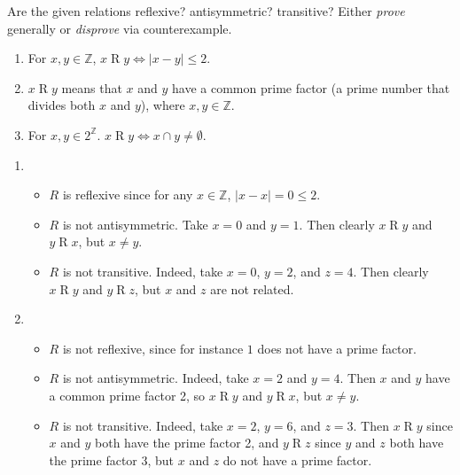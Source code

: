 \documentclass{article}
\newcommand{\Z}{\mathbb{Z}}
\theoremstyle{definition}
\begin{document}
\begin{question}
    Are the given relations reflexive? antisymmetric? transitive? Either \textit{prove} generally or \textit{disprove} via 
    counterexample.
    	\begin{enumerate}
	\item For $x, y \in \Z$,  $x\mathrel{R}y \iff |x - y| \leq 2$. 
	\item  $x\mathrel{R}y$ means that $x$ and $y$ have a common prime factor (a prime number that divides both $x$ and $y$), 
	where $x, y \in \Z$.
	\item For $x, y \in 2^{\Z}$. $x\mathrel{R}y \iff x \cap y \neq \emptyset$.
	\end{enumerate}
\end{question}
\begin{solution}
\begin{enumerate}
	\item
\begin{itemize}
		\item $ R$ is reflexive since for any $x \in \Z$, $|x-x|  = 0 \leq 2$.
		\item $ R$ is not antisymmetric. Take $x = 0$ and $y = 1$. Then clearly $x \mathrel{R}y$ and $y \mathrel{R}x$, but $x \neq y$.
		\item $ R$ is not transitive. Indeed, take $x = 0$, $y = 2$, and $z = 4$. Then clearly $x \mathrel{R}y$ and $y \mathrel{R}z$, but $x$ and $z$ are not related.
	\end{itemize}
	
	\item 
	\begin{itemize}
		\item $ R$ is not reflexive, since for instance $1$ does not have a prime factor.
		\item $ R$ is not antisymmetric. Indeed, take $x = 2$ and $y = 4$. Then $x$ and $y$ have a common prime factor 2, so $x \mathrel{R}y$ and $y \mathrel{R}x$, but $x \neq y$.
		\item $ R$ is not transitive. Indeed, take $x = 2$, $y = 6$, and $z = 3$. Then $x \mathrel{R}y$ since $x$ and $y$ both have the prime factor 2, and $y \mathrel{R}z$ since $y$ and $z$ both have the prime factor 3, but $x$ and $z$ do not have a prime factor.
	\end{itemize}
	

\end{enumerate}
\end{solution}
\end{document}
